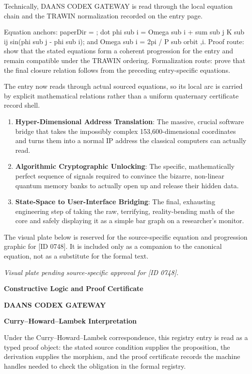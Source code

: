 Technically, DAANS CODEX GATEWAY is read through the local equation chain and the TRAWIN normalization recorded on the entry page.

Equation anchors: paperDir = ; dot phi sub i = Omega sub i + sum sub j K sub ij sin(phi sub j - phi sub i); and Omega sub i = 2pi / P sub orbit ,i. Proof route: show that the stated equations form a coherent progression for the entry and remain compatible under the TRAWIN ordering. Formalization route: prove that the final closure relation follows from the preceding entry-specific equations.

The entry now reads through actual sourced equations, so its local arc is carried by explicit mathematical relations rather than a uniform quaternary certificate record shell.
\endgroup

\begin{enumerate}[leftmargin=1.6em,itemsep=6pt,topsep=4pt]
\item \textbf{Hyper-Dimensional Address Translation}: The massive, crucial software bridge that takes the impossibly complex 153,600-dimensional coordinates and turns them into a normal IP address the classical computers can actually read.
\item \textbf{Algorithmic Cryptographic Unlocking}: The specific, mathematically perfect sequence of signals required to convince the bizarre, non-linear quantum memory banks to actually open up and release their hidden data.
\item \textbf{State-Space to User-Interface Bridging}: The final, exhausting engineering step of taking the raw, terrifying, reality-bending math of the core and safely displaying it as a simple bar graph on a researcher's monitor.
\end{enumerate}

\begingroup\footnotesize\sloppy
The visual plate below is reserved for the source-specific equation and progression graphic for [ID 0748]. It is included only as a companion to the canonical equation, not as a substitute for the formal text.
\par\endgroup
\begingroup\footnotesize\itshape
Visual plate pending source-specific approval for [ID 0748].
\par\endgroup

\clearpage
\begingroup\tzpsupportsetup
\noindent\textbf{\fontsize{10.8pt}{12.8pt}\selectfont [ID 0748] Constructive Logic and Proof Certificate}\par
\noindent\textbf{\fontsize{10pt}{12pt}\selectfont DAANS CODEX GATEWAY}\par
\vspace{0.45em}
\begingroup
\footnotesize
\setlength{\parskip}{0.22em}
\setlength{\parindent}{0pt}
\noindent\textbf{Curry--Howard--Lambek Interpretation}\par
Under the Curry--Howard--Lambek correspondence, this registry entry is read as a typed proof
object: the stated source condition supplies the proposition, the derivation supplies the
morphism, and the proof certificate records the machine handles needed to check the obligation
in the formal registry.

